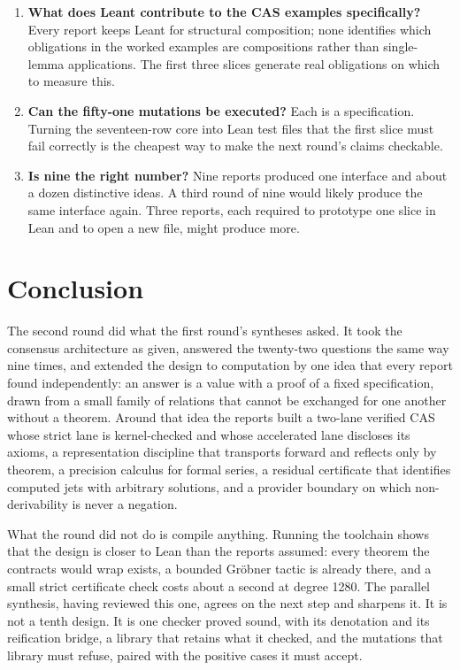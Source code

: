 \documentclass[11pt,a4paper]{article}
\theoremstyle{definition}
\begin{document}
\begin{enumerate}[label=\textbf{R\arabic*.},itemsep=.5em]
\item \textbf{What does Leant contribute to the CAS examples specifically?} Every report keeps Leant for structural composition; none identifies which obligations in the worked examples are compositions rather than single-lemma applications. The first three slices generate real obligations on which to measure this.
\item \textbf{Can the fifty-one mutations be executed?} Each is a specification. Turning the seventeen-row core into Lean test files that the first slice must fail correctly is the cheapest way to make the next round's claims checkable.
\item \textbf{Is nine the right number?} Nine reports produced one interface and about a dozen distinctive ideas. A third round of nine would likely produce the same interface again. Three reports, each required to prototype one slice in Lean and to open a new file, might produce more.
\end{enumerate}

\section{Conclusion}
The second round did what the first round's syntheses asked. It took the consensus architecture as given, answered the twenty-two questions the same way nine times, and extended the design to computation by one idea that every report found independently: an answer is a value with a proof of a fixed specification, drawn from a small family of relations that cannot be exchanged for one another without a theorem. Around that idea the reports built a two-lane verified CAS whose strict lane is kernel-checked and whose accelerated lane discloses its axioms, a representation discipline that transports forward and reflects only by theorem, a precision calculus for formal series, a residual certificate that identifies computed jets with arbitrary solutions, and a provider boundary on which non-derivability is never a negation.

What the round did not do is compile anything. Running the toolchain shows that the design is closer to Lean than the reports assumed: every theorem the contracts would wrap exists, a bounded Gr\"obner tactic is already there, and a small strict certificate check costs about a second at degree 1280. The parallel synthesis, having reviewed this one, agrees on the next step and sharpens it. It is not a tenth design. It is one checker proved sound, with its denotation and its reification bridge, a library that retains what it checked, and the mutations that library must refuse, paired with the positive cases it must accept.
\end{document}
